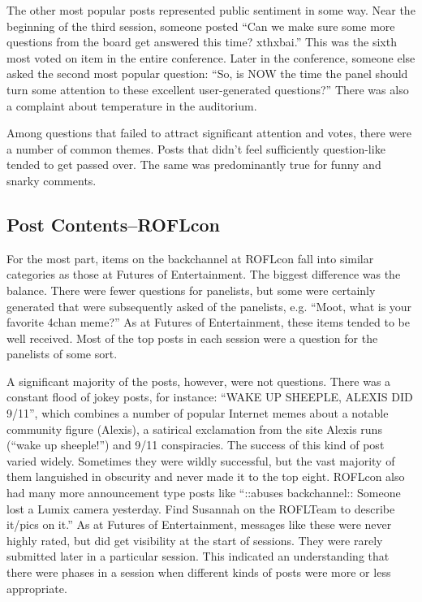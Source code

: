 The other most popular posts represented public sentiment in some way. Near the beginning of the third session, someone posted ``Can we make sure some more questions from the board get answered this time? xthxbai.'' This was the sixth most voted on item in the entire conference. Later in the conference, someone else asked the second most popular question: ``So, is NOW the time the panel should turn some attention to these excellent user-generated questions?'' There was also a complaint about temperature in the auditorium.

Among questions that failed to attract significant attention and votes, there were a number of common themes. Posts that didn't feel sufficiently question-like tended to get passed over. The same was predominantly true for funny and snarky comments. 

\subsection{Post Contents--ROFLcon}
For the most part, items on the backchannel at ROFLcon fall into similar categories as those at Futures of Entertainment. The biggest difference was the balance. There were fewer questions for panelists, but some were certainly generated that were subsequently asked of the panelists, e.g. ``Moot, what is your favorite 4chan meme?'' As at Futures of Entertainment, these items tended to be well received. Most of the top posts in each session were a question for the panelists of some sort.

A significant majority of the posts, however, were not questions. There was a constant flood of jokey posts, for instance: ``WAKE UP SHEEPLE, ALEXIS DID 9/11'', which combines a number of popular Internet memes about a notable community figure (Alexis), a satirical exclamation from the site Alexis runs (``wake up sheeple!'') and 9/11 conspiracies. The success of this kind of post varied widely. Sometimes they were wildly successful, but the vast majority of them languished in obscurity and never made it to the top eight. ROFLcon also had many more announcement type posts like ``::abuses backchannel:: Someone lost a Lumix camera yesterday. Find Susannah on the ROFLTeam to describe it/pics on it.'' As at Futures of Entertainment, messages like these were never highly rated, but did get visibility at the start of sessions. They were rarely submitted later in a particular session. This indicated an understanding that there were phases in a session when different kinds of posts were more or less appropriate. 

